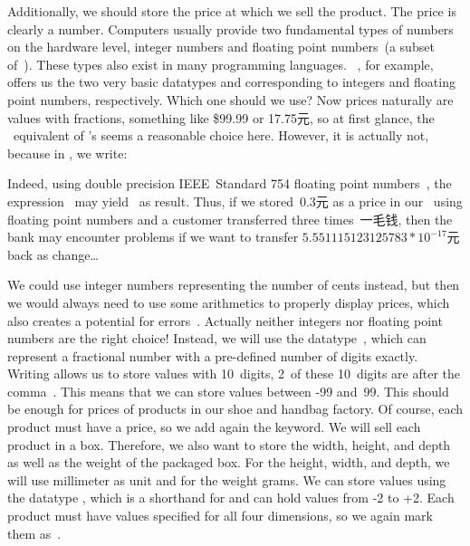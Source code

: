 Additionally, we should store the price at which we sell the product.
The price is clearly a number.
Computers usually provide two fundamental types of numbers on the hardware level, integer numbers and floating point numbers~(a subset of~\realNumbers).
These types also exist in many programming languages.
\python~\cite{programmingWithPython}, for example, offers us the two very basic datatypes  and  corresponding to integers and floating point numbers, respectively.
Which one should we use?
Now prices naturally are values with fractions, something like \$99.99 or 17.75元, so at first glance, the \sql\ equivalent of \python's  seems a reasonable choice here.
However, it is actually not, because in \cite{programmingWithPython}, we write:%
%
%
%
\begin{sloppypar}%
Indeed, using double precision IEEE~Standard 754 floating point numbers~\cite{IEEE2019ISFFPA,H1997IS7FPN}, the expression~ may yield~ as result.
Thus, if we stored~0.3元 as a price in our \db\ using floating point numbers and a customer transferred three times~一毛钱, then the bank may encounter problems if we want to transfer $5.551115123125783*10^{-17}$元 back as change\dots
\end{sloppypar}%
%
%
%
We could use integer numbers representing the number of cents instead, but then we would always need to use some arithmetics to properly display prices, which also creates a potential for errors~\cite{W2020HSISCVISS}.
Actually neither integers nor floating point numbers are the right choice!
Instead, we will use the datatype~, which can represent a fractional number with a pre-defined number of digits exactly.
Writing  allows us to store values with 10~digits, 2~of these 10~digits are after the comma~\cite{PGDG:PD:NT}.
This means that we can store values between -99 and~99.
This should be enough for prices of products in our shoe and handbag factory.
Of course, each product must have a price, so we add again the  keyword.%
%
%
%
We will sell each product in a box.
Therefore, we also want to store the width, height, and depth as well as the weight of the packaged box.
For the height, width, and depth, we will use millimeter as unit and for the weight grams.
We can store values using the datatype , which is a shorthand for  and can hold values from -2 to +2.
Each product must have values specified for all four dimensions, so we again mark them as~.

